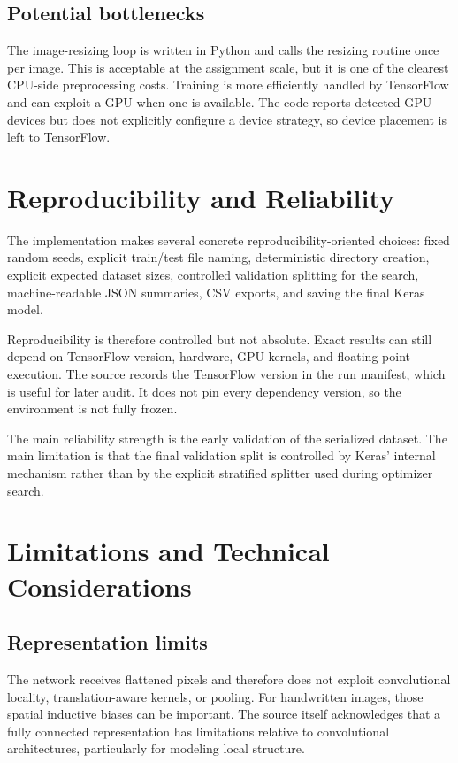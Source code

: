 \documentclass[11pt,a4paper]{article}
\newcommand{\code}[1]{\texttt{\detokenize{#1}}}
\begin{document}
\subsection{Potential bottlenecks}
The image-resizing loop is written in Python and calls the resizing routine once per image. This is acceptable at the assignment scale, but it is one of the clearest CPU-side preprocessing costs. Training is more efficiently handled by TensorFlow and can exploit a GPU when one is available. The code reports detected GPU devices but does not explicitly configure a device strategy, so device placement is left to TensorFlow.

\section{Reproducibility and Reliability}
The implementation makes several concrete reproducibility-oriented choices: fixed random seeds, explicit train/test file naming, deterministic directory creation, explicit expected dataset sizes, controlled validation splitting for the search, machine-readable JSON summaries, CSV exports, and saving the final Keras model.

Reproducibility is therefore controlled but not absolute. Exact results can still depend on TensorFlow version, hardware, GPU kernels, and floating-point execution. The source records the TensorFlow version in the run manifest, which is useful for later audit. It does not pin every dependency version, so the environment is not fully frozen.

The main reliability strength is the early validation of the serialized dataset. The main limitation is that the final validation split is controlled by Keras' internal \code{validation_split} mechanism rather than by the explicit stratified splitter used during optimizer search.

\section{Limitations and Technical Considerations}
\subsection{Representation limits}
The network receives flattened pixels and therefore does not exploit convolutional locality, translation-aware kernels, or pooling. For handwritten images, those spatial inductive biases can be important. The source itself acknowledges that a fully connected representation has limitations relative to convolutional architectures, particularly for modeling local structure.
\end{document}

